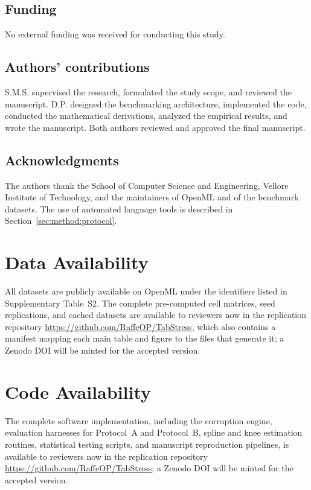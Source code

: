 \documentclass[pdflatex,sn-mathphys]{sn-jnl}
\theoremstyle{thmstyleone}
\theoremstyle{thmstyletwo}
\theoremstyle{thmstylethree}
\begin{document}
\subsection*{Funding}
No external funding was received for conducting this study.

\subsection*{Authors' contributions}
S.M.S. supervised the research, formulated the study scope, and reviewed the manuscript. D.P. designed the benchmarking architecture, implemented the code, conducted the mathematical derivations, analyzed the empirical results, and wrote the manuscript. Both authors reviewed and approved the final manuscript.

\subsection*{Acknowledgments}
The authors thank the School of Computer Science and Engineering, Vellore Institute of Technology, and the maintainers of OpenML and of the benchmark datasets. The use of automated language tools is described in Section~\ref{sec:method:protocol}.

\section*{Data Availability}
All datasets are publicly available on OpenML under the identifiers listed in Supplementary Table~S2. The complete pre-computed cell matrices, seed replications, and cached datasets are available to reviewers now in the replication repository \url{https://github.com/RaffeOP/TabStress}, which also contains a manifest mapping each main table and figure to the files that generate it; a Zenodo DOI will be minted for the accepted version.

\section*{Code Availability}
The complete software implementation, including the corruption engine, evaluation harnesses for Protocol~A and Protocol~B, spline and knee estimation routines, statistical testing scripts, and manuscript reproduction pipelines, is available to reviewers now in the replication repository \url{https://github.com/RaffeOP/TabStress}; a Zenodo DOI will be minted for the accepted version.
\end{document}
